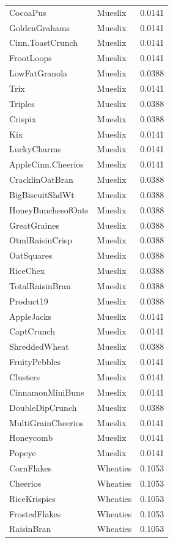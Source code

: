 \begin{longtable}{llr}
CocoaPus & Mueslix & 0.0141 \\
GoldenGrahams & Mueslix & 0.0141 \\
Cinn.ToastCrunch & Mueslix & 0.0141 \\
FrootLoops & Mueslix & 0.0141 \\
LowFatGranola & Mueslix & 0.0388 \\
Trix & Mueslix & 0.0141 \\
Triples & Mueslix & 0.0388 \\
Crispix & Mueslix & 0.0388 \\
Kix & Mueslix & 0.0141 \\
LuckyCharms & Mueslix & 0.0141 \\
AppleCinn.Cheerios & Mueslix & 0.0141 \\
CracklinOatBran & Mueslix & 0.0388 \\
BigBiscuitShdWt & Mueslix & 0.0388 \\
HoneyBunchesofOats & Mueslix & 0.0388 \\
GreatGraines & Mueslix & 0.0388 \\
OtmlRaisinCrisp & Mueslix & 0.0388 \\
OatSquares & Mueslix & 0.0388 \\
RiceChex & Mueslix & 0.0388 \\
TotalRaisinBran & Mueslix & 0.0388 \\
Product19 & Mueslix & 0.0388 \\
AppleJacks & Mueslix & 0.0141 \\
CaptCrunch & Mueslix & 0.0141 \\
ShreddedWheat & Mueslix & 0.0388 \\
FruityPebbles & Mueslix & 0.0141 \\
Clusters & Mueslix & 0.0141 \\
CinnamonMiniBuns & Mueslix & 0.0141 \\
DoubleDipCrunch & Mueslix & 0.0388 \\
MultiGrainCheerios & Mueslix & 0.0141 \\
Honeycomb & Mueslix & 0.0141 \\
Popeye & Mueslix & 0.0141 \\
CornFlakes & Wheaties & 0.1053 \\
Cheerios & Wheaties & 0.1053 \\
RiceKrispies & Wheaties & 0.1053 \\
FrostedFlakes & Wheaties & 0.1053 \\
RaisinBran & Wheaties & 0.1053 \\

\end{longtable}
